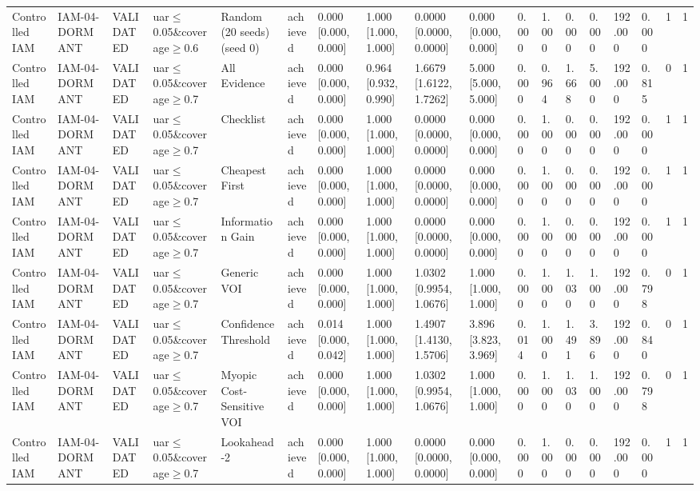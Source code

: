 \begin{table}[!ht]
{\begin{tabular}{llllllllllllllllll}
Controlled IAM & IAM-04-DORMANT & VALIDATED & uar$\le$0.05\&coverage$\ge$0.6 & Random (20 seeds) (seed 0) & achieved & 0.000 [0.000, 0.000] & 1.000 [1.000, 1.000] & 0.0000 [0.0000, 0.0000] & 0.000 [0.000, 0.000] & 0.000 & 1.000 & 0.000 & 0.000 & 192.000 & 0.000 & 1 & 1 \\
Controlled IAM & IAM-04-DORMANT & VALIDATED & uar$\le$0.05\&coverage$\ge$0.7 & All Evidence & achieved & 0.000 [0.000, 0.000] & 0.964 [0.932, 0.990] & 1.6679 [1.6122, 1.7262] & 5.000 [5.000, 5.000] & 0.000 & 0.964 & 1.668 & 5.000 & 192.000 & 0.815 & 0 & 1 \\
Controlled IAM & IAM-04-DORMANT & VALIDATED & uar$\le$0.05\&coverage$\ge$0.7 & Checklist & achieved & 0.000 [0.000, 0.000] & 1.000 [1.000, 1.000] & 0.0000 [0.0000, 0.0000] & 0.000 [0.000, 0.000] & 0.000 & 1.000 & 0.000 & 0.000 & 192.000 & 0.000 & 1 & 1 \\
Controlled IAM & IAM-04-DORMANT & VALIDATED & uar$\le$0.05\&coverage$\ge$0.7 & Cheapest First & achieved & 0.000 [0.000, 0.000] & 1.000 [1.000, 1.000] & 0.0000 [0.0000, 0.0000] & 0.000 [0.000, 0.000] & 0.000 & 1.000 & 0.000 & 0.000 & 192.000 & 0.000 & 1 & 1 \\
Controlled IAM & IAM-04-DORMANT & VALIDATED & uar$\le$0.05\&coverage$\ge$0.7 & Information Gain & achieved & 0.000 [0.000, 0.000] & 1.000 [1.000, 1.000] & 0.0000 [0.0000, 0.0000] & 0.000 [0.000, 0.000] & 0.000 & 1.000 & 0.000 & 0.000 & 192.000 & 0.000 & 1 & 1 \\
Controlled IAM & IAM-04-DORMANT & VALIDATED & uar$\le$0.05\&coverage$\ge$0.7 & Generic VOI & achieved & 0.000 [0.000, 0.000] & 1.000 [1.000, 1.000] & 1.0302 [0.9954, 1.0676] & 1.000 [1.000, 1.000] & 0.000 & 1.000 & 1.030 & 1.000 & 192.000 & 0.798 & 0 & 1 \\
Controlled IAM & IAM-04-DORMANT & VALIDATED & uar$\le$0.05\&coverage$\ge$0.7 & Confidence Threshold & achieved & 0.014 [0.000, 0.042] & 1.000 [1.000, 1.000] & 1.4907 [1.4130, 1.5706] & 3.896 [3.823, 3.969] & 0.014 & 1.000 & 1.491 & 3.896 & 192.000 & 0.840 & 0 & 1 \\
Controlled IAM & IAM-04-DORMANT & VALIDATED & uar$\le$0.05\&coverage$\ge$0.7 & Myopic Cost-Sensitive VOI & achieved & 0.000 [0.000, 0.000] & 1.000 [1.000, 1.000] & 1.0302 [0.9954, 1.0676] & 1.000 [1.000, 1.000] & 0.000 & 1.000 & 1.030 & 1.000 & 192.000 & 0.798 & 0 & 1 \\
Controlled IAM & IAM-04-DORMANT & VALIDATED & uar$\le$0.05\&coverage$\ge$0.7 & Lookahead-2 & achieved & 0.000 [0.000, 0.000] & 1.000 [1.000, 1.000] & 0.0000 [0.0000, 0.0000] & 0.000 [0.000, 0.000] & 0.000 & 1.000 & 0.000 & 0.000 & 192.000 & 0.000 & 1 & 1 \\

\end{tabular}}
\end{table}
